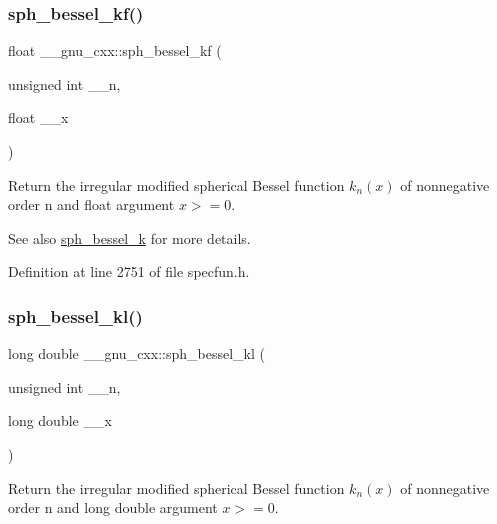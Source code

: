 \subsubsection{\texorpdfstring{sph\+\_\+bessel\+\_\+kf()}{sph\_bessel\_kf()}}
{\footnotesize\ttfamily float \+\_\+\+\_\+gnu\+\_\+cxx\+::sph\+\_\+bessel\+\_\+kf (\begin{DoxyParamCaption}\item[{unsigned int}]{\+\_\+\+\_\+n,  }\item[{float}]{\+\_\+\+\_\+x }\end{DoxyParamCaption})\hspace{0.3cm}{\ttfamily [inline]}}

Return the irregular modified spherical Bessel function $ k_n(x) $ of nonnegative order n and {\ttfamily float} argument $ x >= 0 $.

\begin{DoxySeeAlso}{See also}
\hyperlink{group__gnu__math__spec__func_ga288b28f2c6995d052a4f5f17293cbf1a}{sph\+\_\+bessel\+\_\+k} for more details. 
\end{DoxySeeAlso}


Definition at line 2751 of file specfun.\+h.

\mbox{\label{group__gnu__math__spec__func_ga22f6a73e50e7020a7c2fa64ce1b9be41}} 
\subsubsection{\texorpdfstring{sph\+\_\+bessel\+\_\+kl()}{sph\_bessel\_kl()}}
{\footnotesize\ttfamily long double \+\_\+\+\_\+gnu\+\_\+cxx\+::sph\+\_\+bessel\+\_\+kl (\begin{DoxyParamCaption}\item[{unsigned int}]{\+\_\+\+\_\+n,  }\item[{long double}]{\+\_\+\+\_\+x }\end{DoxyParamCaption})\hspace{0.3cm}{\ttfamily [inline]}}

Return the irregular modified spherical Bessel function $ k_n(x) $ of nonnegative order n and {\ttfamily long double} argument $ x >= 0 $.

